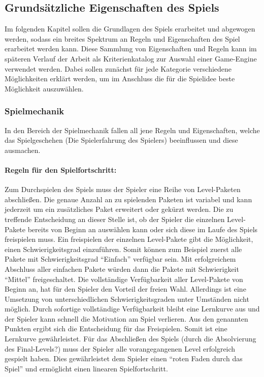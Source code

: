 \subsection{Grundsätzliche Eigenschaften des Spiels}
	Im folgenden Kapitel sollen die Grundlagen des Spiels erarbeitet und abgewogen werden, sodass ein breites Spektrum an Regeln und Eigenschaften des Spiel erarbeitet werden kann. Diese Sammlung von Eigenschaften und Regeln kann im späteren Verlauf der Arbeit als Kriterienkatalog zur Auswahl einer Game-Engine verwendet werden. Dabei sollen zunächst für jede Kategorie verschiedene Möglichkeiten erklärt werden, um im Anschluss die für die Spielidee beste Möglichkeit auszuwählen.

	\subsubsection{Spielmechanik}
	In den Bereich der Spielmechanik fallen all jene Regeln und Eigenschaften, welche das Spielgeschehen (Die Spielerfahrung des Spielers) beeinflussen und diese ausmachen.

		\paragraph{Regeln für den Spielfortschritt:}
		Zum Durchspielen des Spiels muss der Spieler eine Reihe von Level-Paketen abschließen. Die genaue Anzahl an zu spielenden Paketen ist variabel und kann jederzeit um ein zusätzliches Paket erweitert oder gekürzt werden. Die zu treffende Entscheidung an dieser Stelle ist, ob der Spieler die einzelnen Level-Pakete bereits von Beginn an auswählen kann oder sich diese im Laufe des Spiels freispielen muss. Ein freispielen der einzelnen Level-Pakete gibt die Möglichkeit, einen Schwierigkeitsgrad einzuführen. Somit können zum Beispiel zuerst alle Pakete mit Schwierigkeitsgrad \enquote{Einfach} verfügbar sein. Mit erfolgreichem Abschluss aller einfachen Pakete würden dann die Pakete mit Schwierigkeit \enquote{Mittel} freigeschaltet.
		Die vollständige Verfügbarkeit aller Level-Pakete von Beginn an, hat für den Spieler den Vorteil der freien Wahl. Allerdings ist eine Umsetzung von unterschiedlichen Schwierigkeitsgraden unter Umständen nicht möglich. Durch sofortige vollständige Verfügbarkeit bleibt eine Lernkurve aus und der Spieler kann schnell die Motivation am Spiel verlieren.
		Aus den genannten Punkten ergibt sich die Entscheidung für das Freispielen. Somit ist eine Lernkurve gewährleistet. Für das Abschließen des Spiels (durch die Absolvierung des Final-Levels?) muss der Spieler alle vorangegangenen Level erfolgreich gespielt haben. Dies gewährleistet dem Spieler einen \enquote{roten Faden durch das Spiel} und ermöglicht einen linearen Spielfortschritt.

